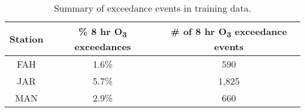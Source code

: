 \begin{table}[H]
\centering
\caption{Summary of exceedance events in training data.}
\label{tb:ExceedEvents}
\begin{tabular}{@{}ccc@{}}
\toprule
\textbf{Station} & \textbf{\% 8 hr O\textsubscript{3} exceedances} & \textbf{\# of 8 hr O\textsubscript{3} exceedance events} \\ \midrule
FAH              & 1.6\%                           & 590                                      \\
JAR              & 5.7\%                           & 1,825                                    \\
MAN              & 2.9\%                           & 660                                      \\ \bottomrule
\end{tabular}
\end{table}